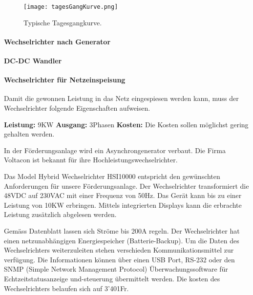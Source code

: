 \begin{figure}[H]
\centering
\texttt{[image: tagesGangKurve.png]}
\caption{Typische Tagesgangkurve. \cite{peakWaterDemand}}
\label{fig:tagesGangKurve}
\end{figure}


\paragraph{Wechselrichter nach Generator}


\paragraph{DC-DC Wandler}


\paragraph{Wechselrichter für Netzeinspeisung} \label{par:WechselrichterNetz}

Damit die gewonnen Leistung in das Netz eingespiesen werden kann, muss der Wechselrichter folgende Eigenschaften aufweisen. 

\textbf{Leistung:}		9KW \newline
\textbf{Ausgang:}		3Phasen \newline
\textbf{Kosten:}		Die Kosten sollen möglichst gering gehalten werden. \newline

In der Förderungsanlage wird ein Asynchrongenerator verbaut. Die Firma Voltacon ist bekannt für ihre Hochleistungswechselrichter.

Das Model Hybrid Wechselrichter HSI10000 entspricht den gewünschten Anforderungen für unsere Förderungsanlage. Der Wechselrichter transformiert die 48VDC auf 230VAC mit einer Frequenz von 50\si{\hertz}. Das Gerät kann bis zu einer Leistung von 10KW erbringen. Mittels integrierten Displays kann die erbrachte Leistung zusätzlich abgelesen werden. 

Gemäss Datenblatt lassen sich Ströme bis 200A regeln. Der Wechselrichter hat einen netzunabhängigen Energiespeicher (Batterie-Backup). Um die Daten des Wechselrichters weiterzuleiten stehen verschieden Kommunikationsmittel zur verfügung. Die Informationen können über einen USB Port, RS-232 oder den SNMP (Simple Network Management Protocol) Überwachungssoftware für Echtzeitstatusanzeige und-steuerung übermittelt werden. Die kosten des Wechselrichters belaufen sich auf 3'401\si{Fr}.


